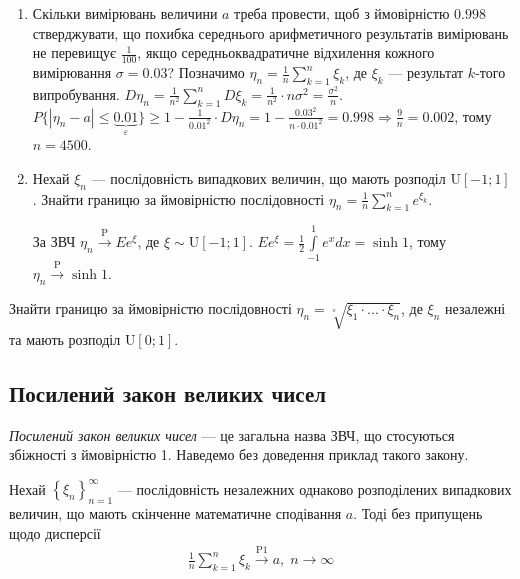 \begin{example}
    \begin{enumerate}
        \item Скільки вимірювань величини $a$ треба провести, щоб з ймовірністю $0.998$ стверджувати, що похибка середнього арифметичного результатів
        вимірювань не перевищує $\frac{1}{100}$, якщо середньоквадратичне відхилення кожного вимірювання $\sigma = 0.03$?
        Позначимо $\eta_n = \frac{1}{n}\sum\limits_{k=1}^n \xi_k$, де $\xi_k$ --- результат $k$-того випробування.
        $D\eta_n = \frac{1}{n^2} \sum\limits_{k=1}^n D\xi_k = \frac{1}{n^2} \cdot n\sigma^2 = \frac{\sigma^2}{n}$.
        $P\{\left|\eta_n - a \right| \leq \underbrace{0.01}_{\varepsilon}\} \geq 1 - \frac{1}{0.01^2}\cdot D\eta_n =
        1 - \frac{0.03^2}{n\cdot 0.01^2} = 0.998 \Rightarrow \frac{9}{n} = 0.002$, тому $n = 4500$.
        \item Нехай $\xi_n$ --- послідовність випадкових величин, що мають розподіл $\mathrm{U}[-1; 1]$. Знайти границю за
        ймовірністю послідовності $\eta_n = \frac{1}{n}\sum\limits_{k=1}^n e^{\xi_k}$.

        За ЗВЧ $\eta_n \overset{\mathrm{P}}{\longrightarrow} E e^\xi$, де $\xi \sim \mathrm{U}[-1; 1]$. 
        $E e^\xi = \frac{1}{2}\int\limits_{-1}^1 e^x dx = \sinh{1}$, тому $\eta_n \overset{\mathrm{P}}{\longrightarrow} \sinh{1}$.
    \end{enumerate}
\end{example}
\begin{exercise}
    Знайти границю за ймовірністю послідовності $\eta_n = \sqrt[^n]{\xi_1 \cdot ... \cdot \xi_n}$, де $\xi_n$ незалежні та мають розподіл $\mathrm{U}[0;1]$.
\end{exercise}


\subsection{Посилений закон великих чисел}
\emph{Посилений закон великих чисел} --- це загальна назва ЗВЧ, що стосуються збіжності з ймовірністю 1. Наведемо без доведення приклад такого закону.
\begin{theorem*}
    Нехай $\left\{ \xi_n\right\}_{n=1}^{\infty}$ --- послідовність незалежних однаково розподілених випадкових величин, що мають скінченне
    математичне сподівання $a$. Тоді без припущень щодо дисперсії
    \begin{gather}\label{Kolm_theor}
        \frac{1}{n}\sum\limits_{k=1}^n \xi_k \overset{\mathrm{P1}}{\longrightarrow} a, \; n \to \infty
    \end{gather}
\end{theorem*}

